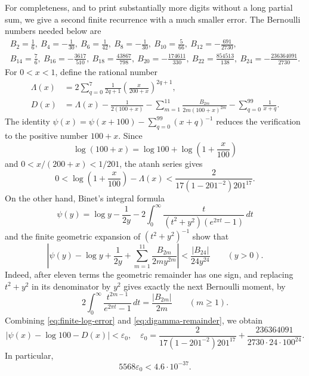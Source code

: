 \documentclass[11pt,reqno,letterpaper]{amsart}
\numberwithin{equation}{section}
\theoremstyle{definition}
\theoremstyle{remark}
\begin{document}
For completeness, and to print substantially more digits without a long
partial sum, we give a second finite recurrence with a much smaller error.
The Bernoulli numbers needed below are
\begin{equation}\label{eq:bernoulli-list}
\begin{gathered}
 B_2=\frac16,\ B_4=-\frac1{30},\ B_6=\frac1{42},\
 B_8=-\frac1{30},\ B_{10}=\frac5{66},\
 B_{12}=-\frac{691}{2730},\\
 B_{14}=\frac76,\ B_{16}=-\frac{3617}{510},\
 B_{18}=\frac{43867}{798},\ B_{20}=-\frac{174611}{330},\
 B_{22}=\frac{854513}{138},\ B_{24}=-\frac{236364091}{2730}.
\end{gathered}
\end{equation}
For \(0<x<1\), define the rational number
\begin{align}
 \Lambda(x)&=2\sum_{q=0}^{7}\frac1{2q+1}
 \left(\frac{x}{200+x}\right)^{2q+1},\label{eq:finite-log-series}\\
 D(x)&=\Lambda(x)-\frac1{2(100+x)}
 -\sum_{m=1}^{11}\frac{B_{2m}}{2m(100+x)^{2m}}
 -\sum_{q=0}^{99}\frac1{x+q}.\label{eq:finite-digamma-recurrence}
\end{align}
The identity \(\psi(x)=\psi(x+100)-\sum_{q=0}^{99}(x+q)^{-1}\)
reduces the verification to the positive number \(100+x\).  Since
\[
 \log(100+x)=\log100+\log\left(1+\frac{x}{100}\right)
\]
and \(0<x/(200+x)<1/201\), the atanh series gives
\begin{equation}\label{eq:finite-log-error}
 0<\log\left(1+\frac{x}{100}\right)-\Lambda(x)
 <\frac{2}{17(1-201^{-2})201^{17}}.
\end{equation}
On the other hand, Binet's integral formula
\[
 \psi(y)=\log y-\frac1{2y}
 -2\int_0^\infty\frac{t}{(t^2+y^2)(e^{2\pi t}-1)}\,dt
\]
and the finite geometric expansion of \((t^2+y^2)^{-1}\) show that
\begin{equation}\label{eq:digamma-remainder}
 \left|\psi(y)-\log y+\frac1{2y}
 +\sum_{m=1}^{11}\frac{B_{2m}}{2m y^{2m}}\right|
 <\frac{|B_{24}|}{24y^{24}}\qquad(y>0).
\end{equation}
Indeed, after eleven terms the geometric remainder has one sign, and
replacing \(t^2+y^2\) in its denominator by \(y^2\) gives exactly the
next Bernoulli moment, by
\[
 2\int_0^\infty\frac{t^{2m-1}}{e^{2\pi t}-1}\,dt
 =\frac{|B_{2m}|}{2m}\qquad(m\geq1).
\]
Combining \eqref{eq:finite-log-error} and
\eqref{eq:digamma-remainder}, we obtain
\begin{equation}\label{eq:D-uniform-error}
 \left|\psi(x)-\log100-D(x)\right|<\varepsilon_0,
 \quad
 \varepsilon_0=
 \frac{2}{17(1-201^{-2})201^{17}}
 +\frac{236364091}{2730\cdot24\cdot100^{24}}.
\end{equation}
In particular,
\begin{equation}\label{eq:aggregate-digamma-error}
 5568\varepsilon_0<4.6\cdot10^{-37}.
\end{equation}
\end{document}
